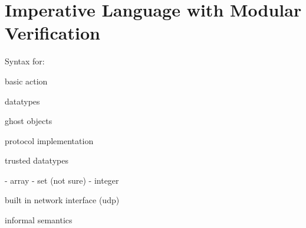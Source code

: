 \section{Imperative Language with Modular Verification}

Syntax for:

basic action

datatypes

ghost objects

protocol implementation

trusted datatypes

 - array
 - set (not sure)
 - integer

built in network interface (udp)

informal semantics




